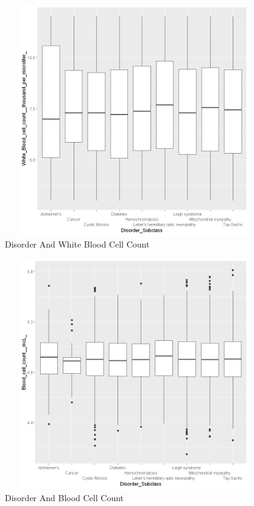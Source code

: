 \begin{figure}[htpb]
	\centering
	\includegraphics[height=10cm, width=12cm]{figures/wbc.png}
	\caption{Disorder And White Blood Cell Count}
	\label{fig 21}
\end{figure}
\begin{figure}[htpb]
	\centering
	\includegraphics[height=10cm, width=12cm]{figures/bc.png}
	\caption{Disorder And Blood Cell Count}
	\label{fig 22}
\end{figure}
